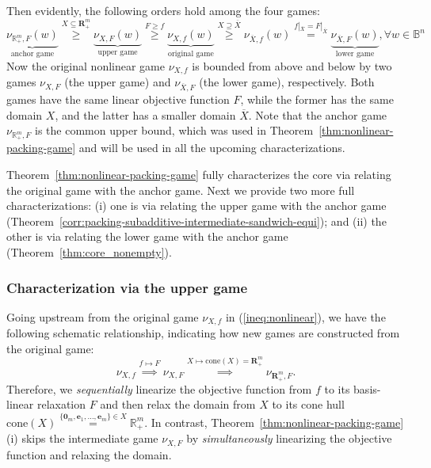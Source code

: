 \documentclass[11pt]{article}\usepackage[]{graphicx}\usepackage[]{xcolor}
\begin{document}
Then evidently, the following orders hold among the four games:  
\begin{equation}\label{ineq:nonlinear}
\underbrace{\nu_{\mathbb{R}^m_{+},F}(w)}_{\text{anchor game}}\overset{X\subseteq \mathbf{R}^m_{+}}{\ge} \underbrace{\nu_{X,F}(w)}_{\text{upper game}}\overset{F\ge f}{\ge} \underbrace{\nu_{X,f}(w)}_{\text{original game}}\overset{X\supseteq \overline{X}}{\ge} \nu_{\overline{X},f}(w)\overset{f|_{\overline{X}}=F|_{\overline{X}}}{=}\underbrace{\nu_{\overline{X},F}(w)}_{\text{lower game}}, \forall w\in\mathbb{B}^n
\end{equation}
Now the original nonlinear game $\nu_{X,f}$ is bounded from above and below by two games $\nu_{X,F}$ (the upper game) and $\nu_{\overline{X},F}$ (the lower game), respectively. Both games have the same linear objective function $F$, while the former has the same domain $X$, and the latter has a smaller domain $\overline{X}$. Note that the anchor game $\nu_{\mathbb{R}^m_{+},F}$ is the common upper bound, which was used in Theorem~\ref{thm:nonlinear-packing-game} and will be used in all the upcoming characterizations. 

Theorem~\ref{thm:nonlinear-packing-game} fully characterizes the core via relating the original game with  the anchor game. Next we provide two more full characterizations: (i) one is via relating the upper game with the anchor game (Theorem~\ref{corr:packing-subadditive-intermediate-sandwich-equi}); and (ii) the other is via relating the lower game with the anchor game (Theorem~\ref{thm:core_nonempty}). 



\subsubsection{Characterization via the upper game}
Going upstream from the original game $\nu_{X,f}$ in (\ref{ineq:nonlinear}), we have the following schematic relationship, indicating how new games are constructed from the original game:
\[
\nu_{X, f}\overset{f\mapsto F}{\implies} \nu_{X, F}\overset{X\mapsto \text{cone}(X)=\mathbf{R}^m_{+}}{\implies} \nu_{\mathbf{R}^m_{+}, F}.
\]
Therefore, we \emph{sequentially} linearize the objective function from $f$ to its basis-linear relaxation $F$ and then relax the domain from $X$ to its cone hull $\text{cone}(X)\overset{\{\mathbf{0}_m, \mathbf{e}_1,\dots, \mathbf{e}_m\}\in X}{=}\mathbb{R}^m_{+}$. In contrast, Theorem~\ref{thm:nonlinear-packing-game}(i) skips the intermediate game $\nu_{X, F}$ by \emph{simultaneously} linearizing the objective function and relaxing the domain. 
\end{document}
